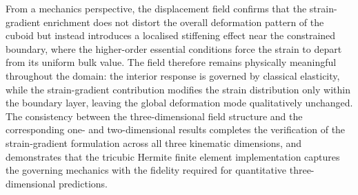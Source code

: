 \documentclass[final,3p,times,fleqn]{elsarticle}
\begin{document}
From a mechanics perspective, the displacement field confirms that the
strain-gradient enrichment does not distort the overall deformation
pattern of the cuboid but instead introduces a localised stiffening
effect near the constrained boundary, where the higher-order essential
conditions force the strain to depart from its uniform bulk value.
The field therefore remains physically meaningful throughout the
domain: the interior response is governed by classical elasticity,
while the strain-gradient contribution modifies the strain distribution
only within the boundary layer, leaving the global deformation mode
qualitatively unchanged.
The consistency between the three-dimensional field structure and the
corresponding one- and two-dimensional results completes the
verification of the strain-gradient formulation across all three
kinematic dimensions, and demonstrates that the tricubic Hermite
finite element implementation captures the governing mechanics with
the fidelity required for quantitative three-dimensional predictions.


\label{sec:3D_tricubic}

%
%
%
\end{document}
